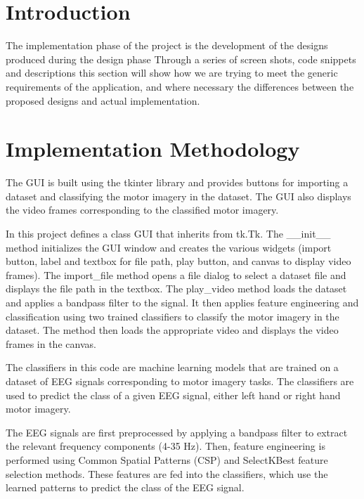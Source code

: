 \documentclass[12pt,a4paper]{report}
\begin{document}
	\section{Introduction}
	\justify The implementation phase of the project is the development of the designs produced during the design phase Through a series of screen shots, code snippets and descriptions this section will show how we are trying to meet the generic requirements of the application, and where necessary the differences between the proposed designs and actual implementation.
	\section{Implementation Methodology}
	\justify  The GUI is built using the tkinter library and provides buttons for importing a dataset and classifying the motor imagery in the dataset. The GUI also displays the video frames corresponding to the classified motor imagery.
	
	\justify In this project defines a class GUI that inherits from tk.Tk. The \_\_init\_\_ method initializes the GUI window and creates the various widgets (import button, label and textbox for file path, play button, and canvas to display video frames). The import\_file method opens a file dialog to select a dataset file and displays the file path in the textbox. The play\_video method loads the dataset and applies a bandpass filter to the signal. It then applies feature engineering and classification using two trained classifiers to classify the motor imagery in the dataset. The method then loads the appropriate video and displays the video frames in the canvas.
	
	\justify The classifiers in this code are machine learning models that are trained on a dataset of EEG signals corresponding to motor imagery tasks. The classifiers are used to predict the class of a given EEG signal, either left hand or right hand motor imagery.
	
	\justify The EEG signals are first preprocessed by applying a bandpass filter to extract the relevant frequency components (4-35 Hz). Then, feature engineering is performed using Common Spatial Patterns (CSP) and SelectKBest feature selection methods. These features are fed into the classifiers, which use the learned patterns to predict the class of the EEG signal.
	
\end{document}
